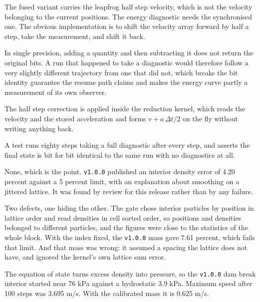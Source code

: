 
 The fused variant carries the leapfrog half step velocity,
which is not the velocity belonging to the current positions. The energy
diagnostic needs the synchronised one. The obvious implementation is to shift
the velocity array forward by half a step, take the measurement, and shift it
back.

 In single precision, adding a quantity and then
subtracting it does not return the original bits. A run that happened to take a
diagnostic would therefore follow a very slightly different trajectory from one
that did not, which breaks the bit identity guarantee the resume path claims
and makes the energy curve partly a measurement of its own observer.

 The half step correction is applied inside the reduction kernel,
which reads the velocity and the stored acceleration and forms $v + a\,\Delta
t/2$ on the fly without writing anything back.

 A test runs eighty steps taking a full diagnostic after
every step, and asserts the final state is bit for bit identical to the same
run with no diagnostics at all.


 None, which is the point. \texttt{v1.0.0} published an interior density error of
4.20 percent against a 5 percent limit, with an explanation about smoothing on a jittered lattice.
It was found by review for this release rather than by any failure.

 Two defects, one hiding the other. The gate chose interior particles by position
in lattice order and read densities in cell sorted order, so positions and densities belonged to
different particles, and the figures were close to the statistics of the whole block. With the index
fixed, the \texttt{v1.0.0} mass gave 7.61 percent, which fails that limit. And that mass was wrong: it
assumed a spacing the lattice does not have, and ignored the kernel's own lattice sum error.

 The equation of state turns excess density into pressure, so the
\texttt{v1.0.0} dam break interior started near 76 kPa against a hydrostatic 3.9 kPa. Maximum speed
after 100 steps was 3.695 m/s. With the calibrated mass it is 0.625 m/s.

